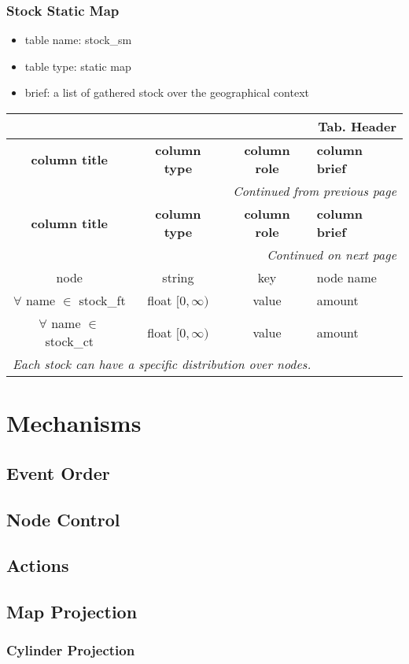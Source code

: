 \documentclass[a4paper,oneside,titlepage]{report}
\newcommand*{\LTHeaderIV}[5]{
  \multicolumn{4}{r}{\textbf{Tab. \thesubsection} \textbf{#1}}\\    
  \hline
  \textbf{#2} & \textbf{#3} & \textbf{#4} & \textbf{#5}\\
  \hline
  
  \endfirsthead
  \multicolumn{4}{r}{\textit{Continued from previous page}}\\    
  \hline
  \textbf{#2} & \textbf{#3} & \textbf{#4} & \textbf{#5}\\
  \hline
  \endhead
  \hline
  \multicolumn{4}{r}{\textit{Continued on next page}}\\
  \endfoot
  \hline
  \endlastfoot  
}
\begin{document}
\subsection{Stock Static Map}
\begin{itemize}
  \setlength{\itemsep}{0pt}
  \setlength{\parskip}{0pt}
\item table name: stock\_sm  
\item table type: static map  
\item brief: a list of gathered stock over the geographical context
\end{itemize}

\begin{longtable}{ |c|c|c|l| } 
  \LTHeaderIV{Header}{column title}{column type}{column role}{column brief}                    
  node & string & key & node name\\
  $\forall$ name $\in$ stock\_ft & float $[0, \infty)$ & value & amount \\
  $\forall$ name $\in$ stock\_ct & float $[0, \infty)$ & value & amount \\
  \multicolumn{4}{|l|}{\textit{Each stock can have a specific distribution over nodes.}}\\
\end{longtable}        

\chapter{Mechanisms}

\section{Event Order}
\section{Node Control}
\section{Actions}

\section{Map Projection}
\subsection{Cylinder Projection}
	
\end{document}
